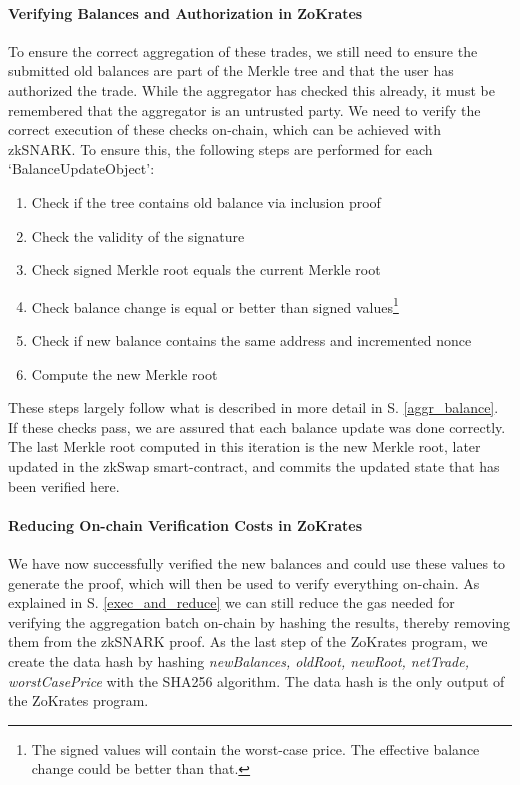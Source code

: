 \documentclass[../../thesis.tex]{subfiles}
\begin{document}
\paragraph{Verifying Balances and Authorization in ZoKrates}
To ensure the correct aggregation of these trades, we still need to ensure the submitted old balances are part of the Merkle tree and that the user has authorized the trade. While the aggregator has checked this already, it must be remembered that the aggregator is an untrusted party. We need to verify the correct execution of these checks on-chain, which can be achieved with zkSNARK. To ensure this, the following steps are performed for each `BalanceUpdateObject':

\begin{enumerate}
    \item Check if the tree contains old balance via inclusion proof
    \item Check the validity of the signature
    \item Check signed Merkle root equals the current Merkle root
    \item Check balance change is equal or better than signed values\footnote{The signed values will contain the worst-case price. The effective balance change could be better than that.}
    \item Check if new balance contains the same address and incremented nonce
    \item Compute the new Merkle root
\end{enumerate}

These steps largely follow what is described in more detail in S. \ref{aggr_balance}. If these checks pass, we are assured that each balance update was done correctly. The last Merkle root computed in this iteration is the new Merkle root, later updated in the zkSwap smart-contract, and commits the updated state that has been verified here.

\paragraph{Reducing On-chain Verification Costs in ZoKrates}
We have now successfully verified the new balances and could use these values to generate the proof, which will then be used to verify everything on-chain. As explained in S. \ref{exec_and_reduce} we can still reduce the gas needed for verifying the aggregation batch on-chain by hashing the results, thereby removing them from the zkSNARK proof. As the last step of the ZoKrates program, we create the data hash by hashing \textit{newBalances, oldRoot, newRoot, netTrade, worstCasePrice} with the SHA256 algorithm. The data hash is the only output of the ZoKrates program.
\end{document}
